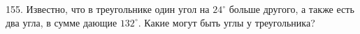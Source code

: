 155. Известно, что в треугольнике один угол на $24^\circ$ больше другого, а также есть два угла, в сумме дающие $132^\circ.$ Какие могут быть углы у треугольника?\\
